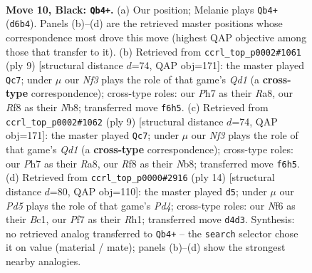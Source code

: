 \documentclass[11pt]{article}
\begin{document}
\clearpage

\begin{figure}[p]\centering
\begin{subfigure}{0.46\textwidth}\centering
\resizebox{\linewidth}{!}{%
\newchessgame
\chessboard[
  setfen={rnb2rk1/pp3ppp/3qpn2/8/2Bp3P/4PN2/PP3PP1/RN1QK2R b KQ - 0 10},
  showmover=false,
  pgfstyle=straightmove, color=movearrow, markmove={d6-b4}
]}
\caption{}
\end{subfigure}\hfill
\begin{subfigure}{0.46\textwidth}\centering
\resizebox{\linewidth}{!}{%
\newchessgame
\chessboard[
  setfen={rnbqkbnr/pp2pppp/8/8/2Bp4/4PN2/PP3PPP/RNBQK2R b KQkq - 0 5},
  showmover=false,
  pgfstyle=straightmove, color=movearrow, markmove={d8-c7}
]}
\caption{}
\end{subfigure}
\\[4pt]
\begin{subfigure}{0.46\textwidth}\centering
\resizebox{\linewidth}{!}{%
\newchessgame
\chessboard[
  setfen={rnbqkbnr/pp2pppp/8/8/2Bp4/4PN2/PP3PPP/RNBQK2R b KQkq - 0 5},
  showmover=false,
  pgfstyle=straightmove, color=movearrow, markmove={d8-c7}
]}
\caption{}
\end{subfigure}\hfill
\begin{subfigure}{0.46\textwidth}\centering
\resizebox{\linewidth}{!}{%
\newchessgame
\chessboard[
  setfen={rnbqk2r/pp2ppbp/1n4p1/2p5/3PP3/6P1/PP2NPBP/RNBQK2R w KQkq - 0 8},
  showmover=false,
  pgfstyle=straightmove, color=movearrow, markmove={d4-d5}
]}
\caption{}
\end{subfigure}
\caption{\textbf{Move 10, Black: \texttt{Qb4+}.} (a) Our position; Melanie plays \texttt{Qb4+} (\texttt{d6b4}). Panels (b)--(d) are the retrieved master positions whose correspondence most drove this move (highest QAP objective among those that transfer to it). (b) Retrieved from \texttt{ccrl\_top\_p0002\#1061} (ply 9) [structural distance $d$=74, QAP obj=171]: the master played \texttt{Qc7}; under $\mu$ our \emph{Nf3} plays the role of that game's \emph{Qd1} (a \textbf{cross-type} correspondence); cross-type roles: our \emph{P}h7 as their \emph{R}a8, our \emph{R}f8 as their \emph{N}b8; transferred move \texttt{f6h5}. (c) Retrieved from \texttt{ccrl\_top\_p0002\#1062} (ply 9) [structural distance $d$=74, QAP obj=171]: the master played \texttt{Qc7}; under $\mu$ our \emph{Nf3} plays the role of that game's \emph{Qd1} (a \textbf{cross-type} correspondence); cross-type roles: our \emph{P}h7 as their \emph{R}a8, our \emph{R}f8 as their \emph{N}b8; transferred move \texttt{f6h5}. (d) Retrieved from \texttt{ccrl\_top\_p0000\#2916} (ply 14) [structural distance $d$=80, QAP obj=110]: the master played \texttt{d5}; under $\mu$ our \emph{Pd5} plays the role of that game's \emph{Pd4}; cross-type roles: our \emph{N}f6 as their \emph{B}c1, our \emph{P}f7 as their \emph{R}h1; transferred move \texttt{d4d3}. Synthesis: no retrieved analog transferred to \texttt{Qb4+} -- the \texttt{search} selector chose it on value (material / mate); panels (b)--(d) show the strongest nearby analogies.}
\label{fig:thought-m19}
\end{figure}
\end{document}
